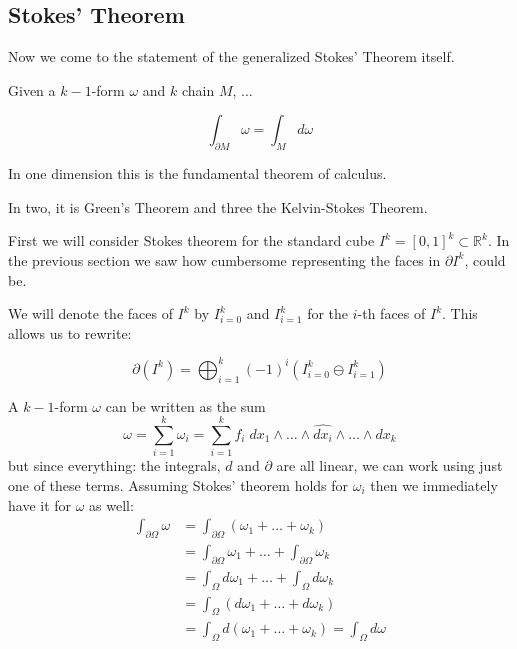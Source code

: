 %
%
\subsection{Stokes' Theorem}

Now we come to the statement of the generalized Stokes' Theorem itself.

Given a $k-1$-form $\omega$ and $k$ chain $M$, ...

\begin{equation}
	\int_{\partial M} \omega = \int_M d\omega
\end{equation}


In one dimension this is the fundamental theorem of calculus.

In two, it is Green's Theorem and three the Kelvin-Stokes Theorem.


First we will consider Stokes theorem for the standard cube $I^k = [0,1]^k \subset \mathbb{R}^k$.
In the previous section we saw how cumbersome representing the faces in $\partial I^k$, could be.

We will denote the faces of $I^k$ by $I^k_{i=0}$ and $I^k_{i=1}$ for the $i$-th faces of $I^k$.
This allows us to rewrite:

\begin{equation}
	\partial (I^k) = \bigoplus_{i=1}^k (-1)^i \left( I^k_{i=0} \ominus I^k_{i=1} \right) 
\end{equation}

A $k-1$-form $\omega$ can be written as the sum
\begin{equation}
	\omega 
		= \sum_{i=1}^k \omega_i 
		= \sum_{i=1}^k f_i \; dx_1 \wedge \ldots \wedge \widehat{dx_i} \wedge  \ldots \wedge dx_k
\end{equation}
but since everything: the integrals, $d$ and $\partial$ are all linear, we can work using just one of these terms.
Assuming Stokes' theorem holds for $\omega_i$ then we immediately have it for $\omega$ as well:
\begin{align*}
	\int_{\partial\Omega} \omega 
	&= \int_{\partial \Omega} (\omega_1 + \ldots + \omega_k) \\
	&= \int_{\partial\Omega} \omega_1 + \ldots + \int_{\partial\Omega} \omega_k  \\
	&= \int_{\Omega} d\omega_1 + \ldots + \int_\Omega d\omega_k \\
	&= \int_\Omega (d\omega_1 + \ldots + d\omega_k)\\
	&= \int_\Omega d(\omega_1 + \ldots + \omega_k) = \int_\Omega d\omega
\end{align*}

